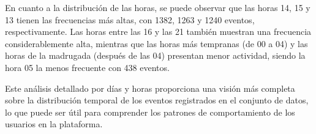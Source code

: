En cuanto a la distribución de las horas, se puede observar que las horas 14, 15 y 13 tienen las frecuencias más altas, con 1382, 1263 y 1240 eventos, respectivamente. Las horas entre las 16 y las 21 también muestran una frecuencia considerablemente alta, mientras que las horas más tempranas (de 00 a 04) y las horas de la madrugada (después de las 04) presentan menor actividad, siendo la hora 05 la menos frecuente con 438 eventos.

Este análisis detallado por días y horas proporciona una visión más completa sobre la distribución temporal de los eventos registrados en el conjunto de datos, lo que puede ser útil para comprender los patrones de comportamiento de los usuarios en la plataforma.
